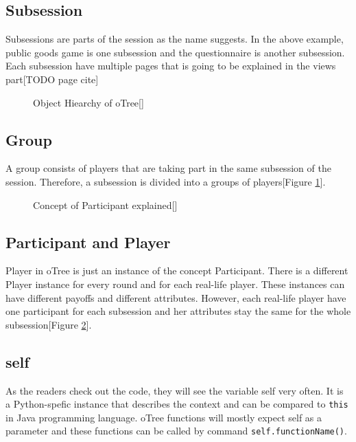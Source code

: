 \subsection{Subsession}

Subsessions are parts of the session as the name suggests. In the above example, public goods game is one subsession and the questionnaire is another subsession. Each subsession have multiple pages that is going to be explained in the views part[TODO page cite]

\begin{figure}[h]
	\centerline{}
	\caption{Object Hiearchy of oTree[\cite{oTreeConcepts2017}]}
	\label{fig:picture4}
	
\end{figure}

\subsection{Group}

A group consists of players that are taking part in the same subsession of the session. Therefore, a subsession is divided into a groups of players[Figure \ref{fig:picture4}].

\begin{figure}[h]
	\centerline{}
	\caption{Concept of Participant explained[\cite{oTreeConcepts2017}]}
	\label{fig:picture5}
	
\end{figure}

\subsection{Participant and Player}

Player in oTree is just an instance of the concept Participant. There is a different Player instance for every round and for each real-life player. These instances can have different payoffs and different attributes. However, each real-life player have one participant for each subsession and her attributes stay the same for the whole subsession[Figure \ref{fig:picture5}].

\subsection{self}

As the readers check out the code, they will see the variable self very often. It is a Python-spefic instance that describes the context and can be compared to \verb|this| in Java programming language. oTree functions will mostly expect self as a parameter and these functions can be called by command \verb|self.functionName()|.



